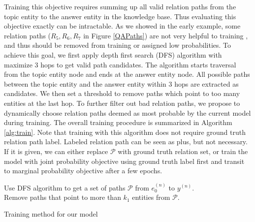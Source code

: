 Training this objective requires summing up all valid relation paths from the topic entity to the answer entity in the knowledge base. Thus evaluating this objective exactly can be intractable. As we showed in the early example, some relation paths ($R_5, R_6, R_7$ in Figure \ref{QAPaths}) are not very helpful to training , and thus should be removed from training or assigned low probabilities. To achieve this goal, we first apply depth first search (DFS) algorithm with maximize 3 hops to get valid path candidates. The algorithm starts traversal from the topic entity node and ends at the answer entity node. All possible paths between the topic entity and the answer entity within 3 hops are extracted as candidates. We then set a threshold to remove paths which point to too many entities at the last hop. To further filter out bad relation paths, we propose to dynamically choose relation paths deemed as most probable by the current model during training. The overall training procedure is summarized in Algorithm \ref{alg:train}. Note that training with this algorithm does not require ground truth relation path label. Labeled relation path can be seen as plus, but not necessary. If it is given, we can either replace $\mathcal{P}$ with ground truth relation set, or train the model with joint probability objective using ground truth label first and transit to marginal probability objective after a few epochs.

\begin{algorithm}

  Use DFS algorithm to get a set of paths $\mathcal{P}$ from $e_0^{(n)}$ to $y^{(n)}$.\\
  Remove paths that point to more than $k_1$ entities from $\mathcal{P}$.\\
  \ForEach {batch}{
      \ForEach{$(x^{n},\mathbf{y}^{n})$ in the batch}{
        Get top $k_2$ paths of $\mathcal{P}$ sorted by $P(\mathbf{r}|q)$ :\\
		  	$\{{\mathbf{r}}^n_{1},\cdots,{\mathbf{r}}^n_{k_2}, P({\mathbf{r}}^n_{1}|q^n),\cdots,P({\mathbf{r}}^n_{K}|q^n,$ $P({y}^n_{1}|{\mathbf{r}}^n_{1},q^n),\cdots,P({y}^n_{K}|{\mathbf{r}}^n_{n},q^n)\}$ \hspace{4ex}= Inference\_with\_current\_model$(q^{n},\mathcal{P}$)\\
		  	$\mathcal{P} = \{{\mathbf{r}}^n_{1},\cdots,{\mathbf{r}}^n_{k_2} \}$\\
        }  
              Update model parameters by maximizing $\sum\limits_{(q^{n},{y}^{n}) \in \text{batch}} \log \sum\limits_{\mathbf{r} \in \mathcal{P}}  P(y^{n}|\mathbf{r},q^{n}) P(\mathbf{r}|q^{n}) $
        }


  \caption{Training method for our model}
  \label{alg:train}
\end{algorithm}
